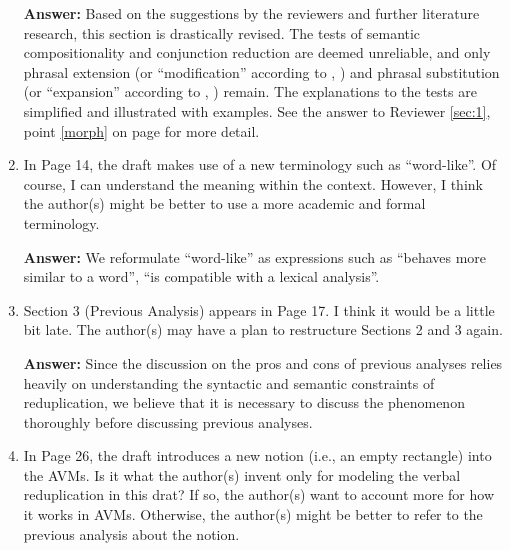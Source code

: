 \documentclass[fleqn,twoside]{article}
\begin{document}
\begin{enumerate}
\textbf{Answer:} 
Based on the suggestions by the reviewers and further literature research, this section is drastically revised.
The tests of semantic compositionality and conjunction reduction are deemed unreliable,
and only phrasal extension (or ``modification'' according to \citealt[32]{Dai1992}, \citeyear[117]{Dai1998})
and phrasal substitution (or ``expansion'' according to \citealt[33]{Dai1992}, \citeyear[117--120]{Dai1998}) remain.
The explanations to the tests are simplified and illustrated with examples.
See the answer to Reviewer \ref{sec:1}, point \ref{morph} on page \pageref{morph} for more detail.


\item
In Page 14, the draft makes use of a new terminology such as ``word-like''. Of course, I can understand the meaning within the context. However, I think the author(s) might be better to use a more academic and formal terminology.

\textbf{Answer:} We reformulate ``word-like'' as expressions such as ``behaves more similar to a word'', ``is compatible with a lexical analysis''.


\item
Section 3 (Previous Analysis) appears in Page 17. I think it would be a little bit late. The author(s) may have a plan to restructure Sections 2 and 3 again.

\noindent
\textbf{Answer: }Since the discussion on the pros and cons of previous analyses relies heavily on understanding the syntactic and semantic constraints of reduplication, we believe that it is necessary to discuss the phenomenon thoroughly before discussing previous analyses.

\item
In Page 26, the draft introduces a new notion (i.e., an empty rectangle) into the AVMs. Is it what
the author(s) invent only for modeling the verbal reduplication in this drat? If so, the author(s)
want to account more for how it works in AVMs. Otherwise, the author(s) might be better to refer to
the previous analysis about the notion.


\end{enumerate}
\end{document}
